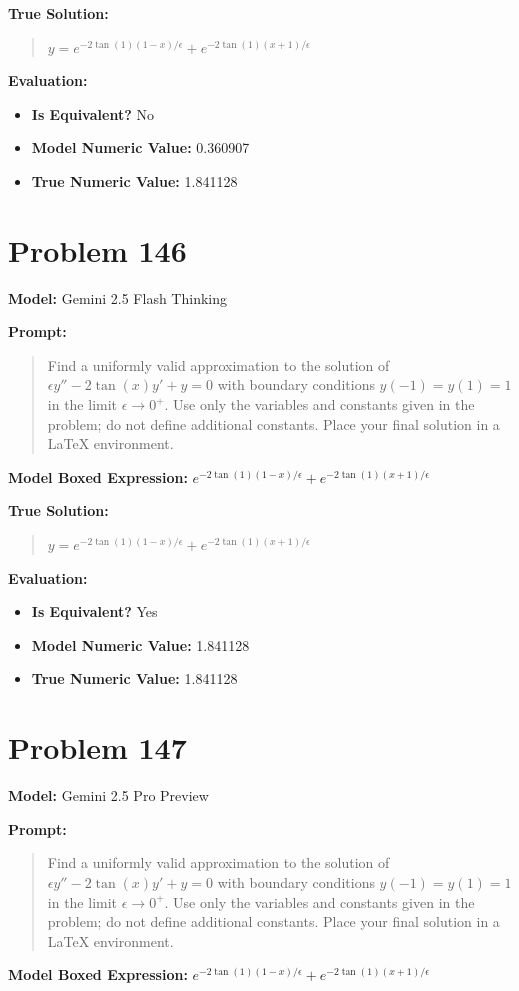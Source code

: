\documentclass{article}
\begin{document}
{\textbf{True Solution:}
\begin{quote}
$y = e^{-2 \tan(1) (1-x)/\epsilon} + e^{-2 \tan(1) (x+1)/\epsilon}$
\end{quote}

\textbf{Evaluation:}
\begin{itemize}
\item \textbf{Is Equivalent?} No
\item \textbf{Model Numeric Value:} 0.360907
\item \textbf{True Numeric Value:} 1.841128
\end{itemize}
\vspace{1cm}
\section*{Problem 146}
\textbf{Model:} Gemini 2.5 Flash Thinking

\textbf{Prompt:}
\begin{quote}
Find a uniformly valid approximation to the solution of $\epsilon y'' - 2 \tan(x) y' + y = 0$ with boundary conditions $y(-1) = y(1) = 1$ in the limit $\epsilon \to 0^+$. Use only the variables and constants given in the problem; do not define additional constants. Place your final solution in a $\boxed{}$ LaTeX environment.
\end{quote}
\textbf{Model Boxed Expression:} $e^{-2\tan(1)(1-x)/\epsilon} + e^{-2\tan(1)(x+1)/\epsilon}$

\textbf{True Solution:}
\begin{quote}
$y = e^{-2 \tan(1) (1-x)/\epsilon} + e^{-2 \tan(1) (x+1)/\epsilon}$
\end{quote}

\textbf{Evaluation:}
\begin{itemize}
\item \textbf{Is Equivalent?} Yes
\item \textbf{Model Numeric Value:} 1.841128
\item \textbf{True Numeric Value:} 1.841128
\end{itemize}
\vspace{1cm}
\section*{Problem 147}
\textbf{Model:} Gemini 2.5 Pro Preview

\textbf{Prompt:}
\begin{quote}
Find a uniformly valid approximation to the solution of $\epsilon y'' - 2 \tan(x) y' + y = 0$ with boundary conditions $y(-1) = y(1) = 1$ in the limit $\epsilon \to 0^+$. Use only the variables and constants given in the problem; do not define additional constants. Place your final solution in a $\boxed{}$ LaTeX environment.
\end{quote}
\textbf{Model Boxed Expression:} $e^{-2\tan(1)(1-x)/\epsilon} + e^{-2\tan(1)(x+1)/\epsilon}$

}
\end{document}
